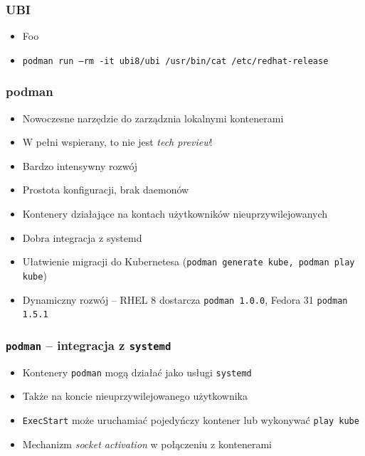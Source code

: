 \documentclass[dvipsnames,table]{beamer}
\begin{document}
\begin{frame}
	\frametitle{UBI}
	\begin{itemize}
		\item Foo
		\item {\tt podman run --rm -it ubi8/ubi /usr/bin/cat /etc/redhat-release}
	\end{itemize}
\end{frame}

\begin{frame}
	\frametitle{podman}
	\begin{itemize}
		\item Nowoczesne narzędzie do zarządznia lokalnymi kontenerami
		\item W pełni wspierany, to nie jest {\em tech preview}!
		\item Bardzo intensywny rozwój
		\item Prostota konfiguracji, brak daemonów
		\item Kontenery działające na kontach użytkowników nieuprzywilejowanych
		\item Dobra integracja z systemd
		\item Ułatwienie migracji do Kubernetesa ({\tt podman generate kube, podman play kube})
		\item Dynamiczny rozwój -- RHEL 8 dostarcza {\tt podman 1.0.0}, Fedora 31 {\tt podman 1.5.1}
	\end{itemize}
\end{frame}

\begin{frame}[fragile]
	\frametitle{{\tt podman} -- integracja z {\tt systemd}}
	\begin{itemize}
		\item Kontenery {\tt podman} mogą działać jako usługi {\tt systemd}
		\item Także na koncie nieuprzywilejowanego użytkownika
		\item {\tt ExecStart} może uruchamiać pojedyńczy kontener lub wykonywać {\tt play kube}
		\item Mechanizm {\em socket activation} w połączeniu z kontenerami
	\end{itemize}
%
\end{frame}
\end{document}
